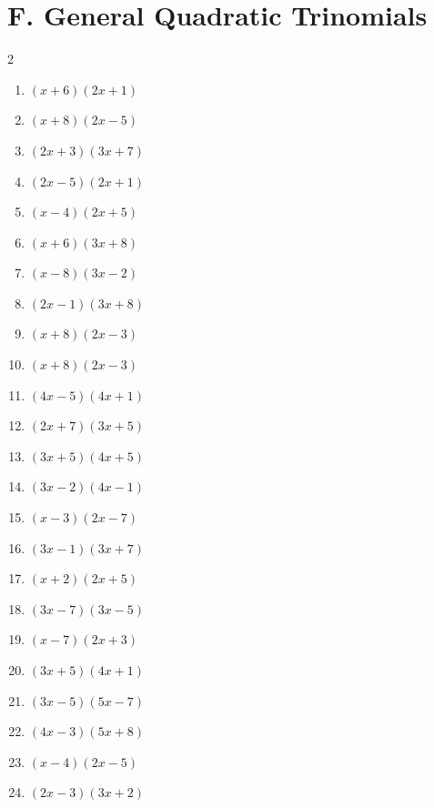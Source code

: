 \documentclass[11pt,oneside]{book}
\begin{document}
\section*{F. General Quadratic Trinomials}
\begin{multicols}{2}
\begin{enumerate}[leftmargin=*,label=\textbf{F\arabic*.},itemsep=0.45\baselineskip]
\item $ \left(x + 6\right) \left(2 x + 1\right) $
\item $ \left(x + 8\right) \left(2 x - 5\right) $
\item $ \left(2 x + 3\right) \left(3 x + 7\right) $
\item $ \left(2 x - 5\right) \left(2 x + 1\right) $
\item $ \left(x - 4\right) \left(2 x + 5\right) $
\item $ \left(x + 6\right) \left(3 x + 8\right) $
\item $ \left(x - 8\right) \left(3 x - 2\right) $
\item $ \left(2 x - 1\right) \left(3 x + 8\right) $
\item $ \left(x + 8\right) \left(2 x - 3\right) $
\item $ \left(x + 8\right) \left(2 x - 3\right) $
\item $ \left(4 x - 5\right) \left(4 x + 1\right) $
\item $ \left(2 x + 7\right) \left(3 x + 5\right) $
\item $ \left(3 x + 5\right) \left(4 x + 5\right) $
\item $ \left(3 x - 2\right) \left(4 x - 1\right) $
\item $ \left(x - 3\right) \left(2 x - 7\right) $
\item $ \left(3 x - 1\right) \left(3 x + 7\right) $
\item $ \left(x + 2\right) \left(2 x + 5\right) $
\item $ \left(3 x - 7\right) \left(3 x - 5\right) $
\item $ \left(x - 7\right) \left(2 x + 3\right) $
\item $ \left(3 x + 5\right) \left(4 x + 1\right) $
\item $ \left(3 x - 5\right) \left(5 x - 7\right) $
\item $ \left(4 x - 3\right) \left(5 x + 8\right) $
\item $ \left(x - 4\right) \left(2 x - 5\right) $
\item $ \left(2 x - 3\right) \left(3 x + 2\right) $

\end{enumerate}
\end{multicols}
\end{document}
